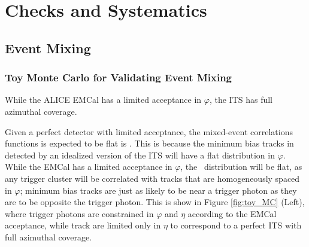 \chapter{Checks and Systematics}


\section{Event Mixing}

\subsection{Toy Monte Carlo for Validating Event Mixing}
\label{sec:ToyMC_Mixing}

While the ALICE EMCal has a limited acceptance in $\varphi$, the ITS has full azimuthal coverage. 

Given a perfect detector with limited acceptance, the mixed-event correlations functions is expected to be flat is \deltaeta. This is because the minimum bias tracks in detected by an idealized version of the ITS will have a flat distribution in $\varphi$. While the EMCal has a limited acceptance in $\varphi$, the \deltaphi~distribution will be flat, as any trigger cluster will be correlated with tracks that are homogeneously spaced in $\varphi$; minimum bias tracks are just as likely to be near a trigger photon as they are to be opposite the trigger photon. This is show in Figure \ref{fig:toy_MC} (Left), where trigger photons are constrained in $\varphi$ and $\eta$ according to the EMCal acceptance, while track are limited only in $\eta$ to correspond to a perfect ITS with full azimuthal coverage.  

